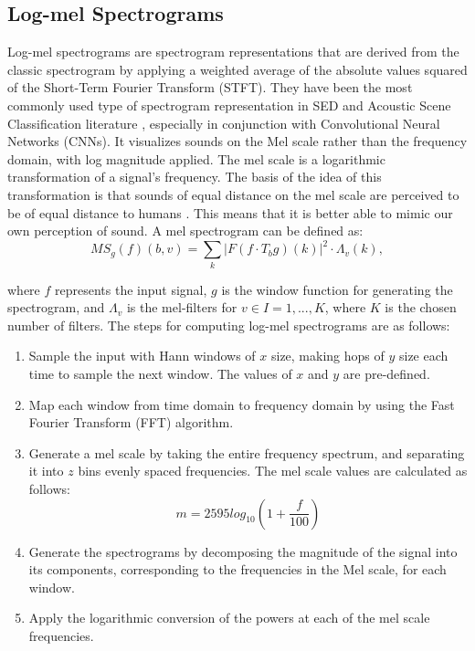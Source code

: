 
\subsection{Log-mel Spectrograms}
Log-mel spectrograms \cite{hershey2017cnn} are spectrogram representations that are derived from the classic spectrogram by applying a weighted average of the absolute values squared of the Short-Term Fourier Transform (STFT). They have been the most commonly used type of spectrogram representation in SED and Acoustic Scene Classification literature \cite{kong2020sound, Miyazaki2020CONFORMERBASEDSE, const_thres}, especially in conjunction with Convolutional Neural Networks (CNNs). It visualizes sounds on the Mel scale rather than the frequency domain, with log magnitude applied. The mel scale is a logarithmic transformation of a signal’s frequency. The basis of the idea of this transformation is that sounds of equal distance on the mel scale are perceived to be of equal distance to humans \cite{mel-scale}. This means that it is better able to mimic our own perception of sound. A mel spectrogram can be defined as:
\begin{equation}
MS_g(f)(b, v) = \sum_k|F(f \cdot T_bg)(k)|^2 \cdot \Lambda_v(k),
\end{equation}

where \(f\) represents the input signal, \(g\) is the window function for generating the spectrogram, and \(\Lambda_v\) is the mel-filters for \(v \in I = {1, . . . , K}\), where \(K\) is the chosen number of filters. The steps for computing log-mel spectrograms are as follows:
\begin{enumerate}
\item{Sample the input with Hann windows of \(x\) size, making hops of \(y\) size each time to sample the next window. The values of \(x\) and \(y\) are pre-defined.}
\item{Map each window from time domain to frequency domain by using the Fast Fourier Transform (FFT) algorithm.}
\item{Generate a mel scale by taking the entire frequency spectrum, and separating it into \(z\) bins evenly spaced frequencies. The mel scale values are calculated as follows:
\begin{equation}
    m = 2595 log_{10}(1 + \frac{f}{100})
\end{equation}}
\item{Generate the spectrograms by decomposing the magnitude of the signal into its components, corresponding to the frequencies in the Mel scale, for each window. }
\item{Apply the logarithmic conversion of the powers at each of the mel scale frequencies.}
\end{enumerate}

